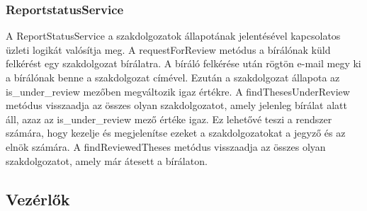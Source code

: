 \subsubsection{ReportstatusService}

A ReportStatusService a szakdolgozatok állapotának jelentésével kapcsolatos üzleti logikát valósítja meg. A requestForReview metódus a bírálónak küld felkérést egy szakdolgozat bírálatra. A bíráló felkérése után rögtön e-mail megy ki a bírálónak benne a szakdolgozat címével. Ezután a szakdolgozat állapota az is\_under\_review mezőben megváltozik igaz értékre. A findThesesUnderReview metódus visszaadja az összes olyan szakdolgozatot, amely jelenleg bírálat alatt áll, azaz az is\_under\_review mező értéke igaz. Ez lehetővé teszi a rendszer számára, hogy kezelje és megjelenítse ezeket a szakdolgozatokat a jegyző és az elnök számára. A findReviewedTheses metódus visszaadja az összes olyan szakdolgozatot, amely már átesett a bírálaton. 


\subsection{Vezérlők}


